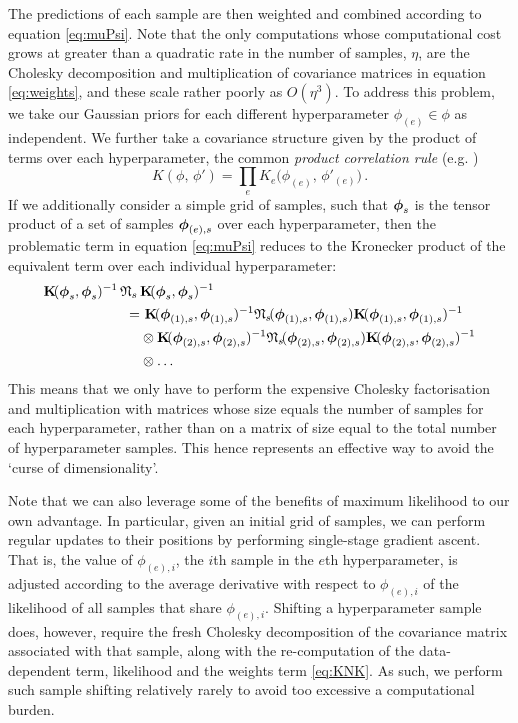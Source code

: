 \documentclass{acmsmall}
\begin{document}
The predictions of each sample are then weighted and combined according to equation \eqref{eq:muPsi}. Note that the only computations whose computational cost grows at greater than a quadratic rate in the number of samples, $\eta$, are the Cholesky decomposition and multiplication of covariance matrices in equation \eqref{eq:weights}, and these scale rather poorly as $O(\eta^3)$. To address this problem, we take our Gaussian priors for each different hyperparameter $\phi_{(e)} \in \phi$ as independent. We further take a covariance structure given by the product of terms over each hyperparameter, the common \emph{product correlation rule} (e.g. )
\begin{equation}
 K(\phi,\,\phi')=\prod_e K_e\Big(\phi_{(e)},\,\phi'_{(e)}\Big)\,.
\end{equation}
If we additionally consider a simple grid of samples, such that $\boldsymbol{\phi}_s$ is the tensor product of a set of samples $\boldsymbol{\phi}_{(e),s}$ over each hyperparameter, then the problematic term in equation \eqref{eq:muPsi} reduces to the Kronecker product of the equivalent term over each individual hyperparameter:
\begin{align}\label{eq:KNK}
\mat{K} \!(\vph_s,\vph_s)^{-1}\,\Nt\,&\mat{K}\!(\vph_s,\vph_s)^{-1}\nonumber\\
 = & ~\mat{K}\!(\vph_{(1),s},\vph_{(1),s})^{-1}\Nt\!(\vph_{(1),s},\vph_{(1),s})\mat{K}\!(\vph_{(1),s},\vph_{(1),s})^{-1}\nonumber\\ & \otimes \mat{K}\!(\vph_{(2),s},\vph_{(2),s})^{-1}\Nt\!(\vph_{(2),s},\vph_{(2),s})\mat{K}\!(\vph_{(2),s},\vph_{(2),s})^{-1}\nonumber\\ & \otimes \ldots
\end{align}
This means that we only have to perform the expensive Cholesky factorisation and multiplication with matrices whose size equals the number of samples for each hyperparameter, rather than on a matrix of size equal to the total number of hyperparameter samples. This hence represents an effective way to avoid the `curse of dimensionality'. 

Note that we can also leverage some of the benefits of maximum likelihood to our own advantage. In particular, given an initial grid of samples, we can perform regular updates to their positions by performing single-stage gradient ascent. That is, the value of $\phi_{(e),i}$, the $i$th sample in the $e$th hyperparameter, is adjusted according to the average derivative with respect to $\phi_{(e),i}$ of the likelihood of all samples that share $\phi_{(e),i}$. Shifting a hyperparameter sample does, however, require the fresh Cholesky decomposition of the covariance matrix associated with that sample, along with the re-computation of the data-dependent term, likelihood and the weights term \eqref{eq:KNK}. As such, we perform such sample shifting relatively rarely to avoid too excessive a computational burden.
\end{document}
